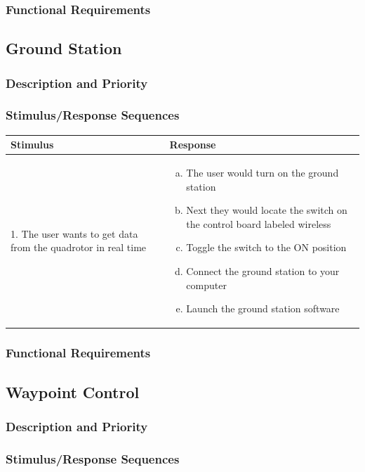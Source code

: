 \documentclass[english]{article}
\numberwithin{equation}{section} %
\begin{document}
\subsubsection{Functional Requirements}
\bigskip
\subsection{Ground Station}
\subsubsection{Description and Priority}
\subsubsection{Stimulus/Response Sequences}

\begin{longtable}{p{3cm} | p{10cm}}
\hline
\textbf{Stimulus} & \textbf{Response}\\
\hline
1. The user wants to get data from the quadrotor in real time &
\begin{enumerate}[(a)]\itemsep1pt %
\item The user would turn on the ground station
\item Next they would locate the switch on the control board labeled wireless
\item Toggle the switch to the ON position
\item Connect the ground station to your computer
\item Launch the ground station software 
\end{enumerate}
\\ 
\hline
\end{longtable}



\subsubsection{Functional Requirements}
\bigskip
\subsection{Waypoint Control}
\subsubsection{Description and Priority}
\subsubsection{Stimulus/Response Sequences}
\end{document}
